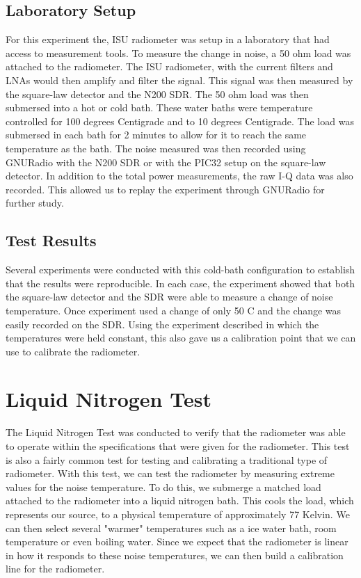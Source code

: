 \subsection{Laboratory Setup}
For this experiment the, ISU radiometer was setup in a laboratory that had access to measurement tools.  To measure the change in noise, a 50 ohm load was attached to the radiometer.  The ISU radiometer, with the current filters and LNAs would then amplify and filter the signal.  This signal was then measured by the square-law detector and the N200 SDR.  The 50 ohm load was then submersed into a hot or cold bath.  These water baths were temperature controlled for 100 degrees Centigrade and to 10 degrees Centigrade.  The load was submersed in each bath for 2 minutes to allow for it to reach the same temperature as the bath.  The noise measured was then recorded using GNURadio with the N200 SDR or with the PIC32 setup on the square-law detector.  In addition to the total power measurements, the raw I-Q data was also recorded.  This allowed us to replay the experiment through GNURadio for further study.
\subsection{Test Results}

Several experiments were conducted with this cold-bath configuration to establish that the results were reproducible.  In each case, the experiment showed that both the square-law detector and the SDR were able to measure a change of noise temperature.  Once experiment used a change of only 50 C and the change was easily recorded on the SDR.  Using the experiment described in which the temperatures were held constant, this also gave us a calibration point that we can use to calibrate the radiometer.

\section{Liquid Nitrogen Test}
The Liquid Nitrogen Test was conducted to verify that the radiometer was able to operate within the specifications that were given for the radiometer.  This test is also a fairly common test for testing and calibrating a traditional type of radiometer.  With this test, we can test the radiometer by measuring extreme values for the noise temperature.  To do this, we submerge a matched load attached to the radiometer into a liquid nitrogen bath.  This cools the load, which represents our source, to a physical temperature of approximately 77 Kelvin.  We can then select several "warmer" temperatures such as a ice water bath, room temperature or even boiling water.  Since we expect that the radiometer is linear in how it responds to these noise temperatures, we can then build a calibration line for the radiometer.

